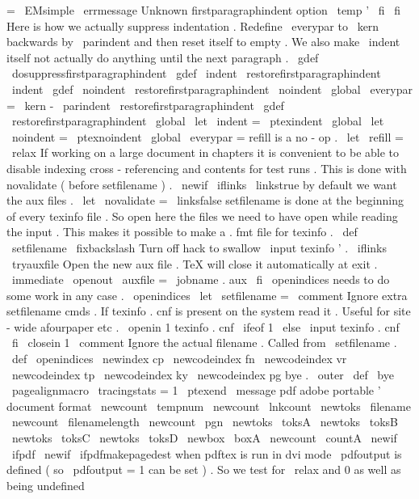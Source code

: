 {{=
\
EMsimple
\
errmessage
{
Unknown
firstparagraphindent
option
\
temp
'
}
%
\
fi
\
fi
}
%
Here
is
how
we
actually
suppress
indentation
.
Redefine
\
everypar
to
%
\
kern
backwards
by
\
parindent
and
then
reset
itself
to
empty
.
%
%
We
also
make
\
indent
itself
not
actually
do
anything
until
the
next
%
paragraph
.
%
\
gdef
\
dosuppressfirstparagraphindent
{
%
\
gdef
\
indent
{
%
\
restorefirstparagraphindent
\
indent
}
%
\
gdef
\
noindent
{
%
\
restorefirstparagraphindent
\
noindent
}
%
\
global
\
everypar
=
{
%
\
kern
-
\
parindent
\
restorefirstparagraphindent
}
%
}
\
gdef
\
restorefirstparagraphindent
{
%
\
global
\
let
\
indent
=
\
ptexindent
\
global
\
let
\
noindent
=
\
ptexnoindent
\
global
\
everypar
=
{
}
%
}
%
refill
is
a
no
-
op
.
\
let
\
refill
=
\
relax
%
If
working
on
a
large
document
in
chapters
it
is
convenient
to
%
be
able
to
disable
indexing
cross
-
referencing
and
contents
for
test
runs
.
%
This
is
done
with
novalidate
(
before
setfilename
)
.
%
\
newif
\
iflinks
\
linkstrue
%
by
default
we
want
the
aux
files
.
\
let
\
novalidate
=
\
linksfalse
%
setfilename
is
done
at
the
beginning
of
every
texinfo
file
.
%
So
open
here
the
files
we
need
to
have
open
while
reading
the
input
.
%
This
makes
it
possible
to
make
a
.
fmt
file
for
texinfo
.
\
def
\
setfilename
{
%
\
fixbackslash
%
Turn
off
hack
to
swallow
\
input
texinfo
'
.
\
iflinks
\
tryauxfile
%
Open
the
new
aux
file
.
TeX
will
close
it
automatically
at
exit
.
\
immediate
\
openout
\
auxfile
=
\
jobname
.
aux
\
fi
%
\
openindices
needs
to
do
some
work
in
any
case
.
\
openindices
\
let
\
setfilename
=
\
comment
%
Ignore
extra
setfilename
cmds
.
%
%
If
texinfo
.
cnf
is
present
on
the
system
read
it
.
%
Useful
for
site
-
wide
afourpaper
etc
.
\
openin
1
texinfo
.
cnf
\
ifeof
1
\
else
\
input
texinfo
.
cnf
\
fi
\
closein
1
%
\
comment
%
Ignore
the
actual
filename
.
}
%
Called
from
\
setfilename
.
%
\
def
\
openindices
{
%
\
newindex
{
cp
}
%
\
newcodeindex
{
fn
}
%
\
newcodeindex
{
vr
}
%
\
newcodeindex
{
tp
}
%
\
newcodeindex
{
ky
}
%
\
newcodeindex
{
pg
}
%
}
%
bye
.
\
outer
\
def
\
bye
{
\
pagealignmacro
\
tracingstats
=
1
\
ptexend
}
\
message
{
pdf
}
%
adobe
portable
'
document
format
\
newcount
\
tempnum
\
newcount
\
lnkcount
\
newtoks
\
filename
\
newcount
\
filenamelength
\
newcount
\
pgn
\
newtoks
\
toksA
\
newtoks
\
toksB
\
newtoks
\
toksC
\
newtoks
\
toksD
\
newbox
\
boxA
\
newcount
\
countA
\
newif
\
ifpdf
\
newif
\
ifpdfmakepagedest
%
when
pdftex
is
run
in
dvi
mode
\
pdfoutput
is
defined
(
so
\
pdfoutput
=
1
%
can
be
set
)
.
So
we
test
for
\
relax
and
0
as
well
as
being
undefined
}
